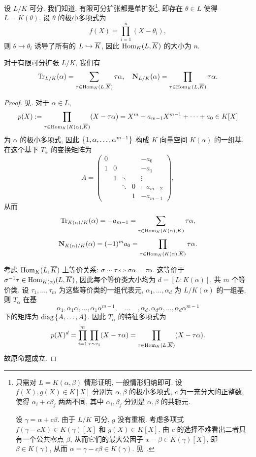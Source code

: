 设 $L/K$ 可分. 我们知道, 有限可分扩张都是单扩张\footnote{只需对 $L=K(\alpha,\beta)$ 情形证明, 一般情形归纳即可. 设 $f(X),g(X)\in K[X]$ 分别为 $\alpha,\beta$ 的极小多项式, $c$ 为一充分大的正整数, 使得 $\alpha_i+c\beta_j$ 两两不同, 其中 $\alpha_i,\beta_j$ 分别是 $\alpha,\beta$ 的共轭元.

设 $\gamma=\alpha+c\beta$.
由于 $L/K$ 可分, $g$ 没有重根.
考虑多项式 $f(\gamma-cX)\in K(\gamma)[X]$ 和 $g(X)\in K[X]$. 由 $c$ 的选择不难看出二者只有一个公共零点 $\beta$, 从而它们的最大公因子 $x-\beta\in K(\gamma)[X]$, 即 $\beta\in K(\gamma)$, 从而 $\alpha=\gamma-c\beta\in K(\gamma)$. 见~\cite[\S3.2 定理2]{FengLiZhang2009}.}, 即存在 $\theta\in L$ 使得 $L=K(\theta)$. 设 $\theta$ 的极小多项式为
	\[f(X)=\prod_{i=1}^n (X-\theta_i),\]
则 $\theta\mapsto \theta_i$ 诱导了所有的 $L\hookrightarrow \overline K$, 因此 ${\mathrm{Hom}}_K(L,\overline K)$ 的大小为 $n$.

\begin{proposition}{}{}
对于有限可分扩张 $L/K$, 我们有
	\[{\mathrm{Tr}}_{L/K}(\alpha)=\sum_{\tau\in{\mathrm{Hom}}_K(L,\overline K)}\tau\alpha,\quad 
		{\mathbf{N}}_{L/K}(\alpha)=\prod_{\tau\in{\mathrm{Hom}}_K(L,\overline K)}\tau\alpha.\]
\end{proposition}
\begin{proof}
见\cite[Chapter I, Proposition2.6]{Neukirch1999}.
对于 $\alpha\in L$, 
	\[p(X):=\prod_{\tau\in{\mathrm{Hom}}_K(K(\alpha),\overline K)} (X-\tau\alpha)=X^m+a_{m-1} X^{m-1}+\cdots+a_0\in K[X]\]
为 $\alpha$ 的极小多项式, 因此 $\left\{1,\alpha,\dots,\alpha^{m-1}\right\}$ 构成 $K$ 向量空间 $K(\alpha)$ 的一组基. 在这个基下 $T_\alpha$ 的变换矩阵为
	\[A=\begin{pmatrix}
		 0 &   &        &   &-a_0\\
		 1 & 0 &        &   &-a_1\\
			 & 1 & \ddots &   &\vdots\\
			 &   & \ddots & 0 &-a_{m-2}\\
			 &   &        & 1 &-a_{m-1}
	\end{pmatrix},\]
从而
	\[{\mathrm{Tr}}_{K(\alpha)/K}(\alpha)=-a_{m-1}=\sum_{\tau\in{\mathrm{Hom}}_K(K(\alpha),\overline K)}\tau\alpha,\]
	\[{\mathbf{N}}_{K(\alpha)/K}(\alpha)=(-1)^m a_0=\prod_{\tau\in{\mathrm{Hom}}_K(K(\alpha),\overline K)}\tau\alpha.\]

考虑 ${\mathrm{Hom}}_K(L,\overline K)$ 上等价关系: $\sigma\sim \tau\iff \sigma \alpha=\tau\alpha$. 这等价于 $\sigma^{-1}\tau\in{\mathrm{Hom}}_{K(\alpha)}(L,\overline K)$, 因此每个等价类大小均为 $d=[L:K(\alpha)]$, 共 $m$ 个等价类. 设 $\tau_1,\dots,\tau_m$ 为这些等价类的一组代表元, $\alpha_1,\dots,\alpha_d$ 为 $L/K(\alpha)$ 的一组基, 则 $T_\alpha$ 在基 
	\[\alpha_1,\alpha_1\alpha,\dots,\alpha_1\alpha^{m-1},
	\quad\dots\quad,
	\alpha_d,\alpha_d\alpha,\dots,\alpha_d\alpha^{m-1}\]
下的矩阵为 ${\mathrm{diag}}\left\{A,\dots,A\right\}$. 因此 $T_\alpha$ 的特征多项式为
	\[p(X)^d=\prod_{i=1}^m\prod_{\tau\sim\tau_i}(X-\tau \alpha)=\prod_{\tau\in{\mathrm{Hom}}_K(L,\overline K)}(X-\tau\alpha).\]
故原命题成立.
\end{proof}

